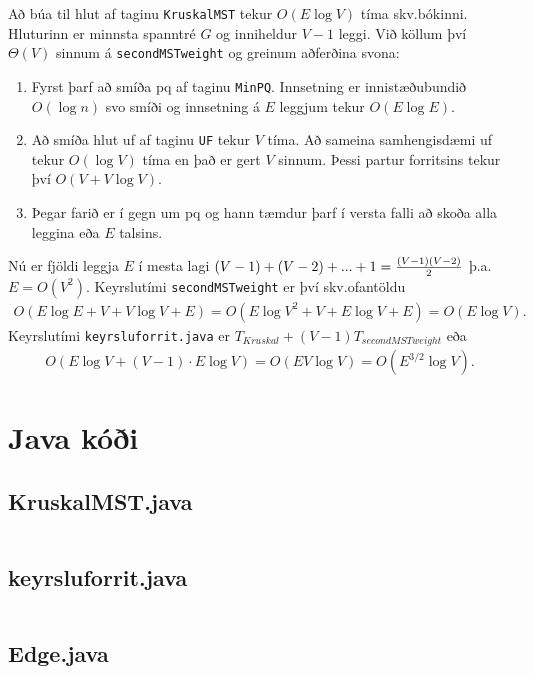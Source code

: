 \documentclass[a4paper,oneside]{article}
\begin{document}
\noindent
Að búa til hlut af taginu \texttt{KruskalMST} tekur $O(E \log V)$ tíma skv.\@ bókinni. Hluturinn er minnsta spanntré $G$ og inniheldur $V-1$ leggi. Við köllum því $\Theta(V)$ sinnum á \texttt{secondMSTweight} og greinum aðferðina svona:
\begin{enumerate}
    \item Fyrst þarf að smíða pq af taginu \texttt{MinPQ}. Innsetning er innistæðubundið $O(\log n)$ svo smíði og innsetning á $E$ leggjum tekur $O(E \log E)$.
    \item Að smíða hlut uf af taginu \texttt{UF} tekur $V$ tíma. Að sameina samhengisdæmi uf tekur $O(\log V)$ tíma en það er gert $V$ sinnum. Þessi partur forritsins tekur því $O(V +  V \log V)$.
    \item Þegar farið er í gegn um pq og hann tæmdur þarf í versta falli að skoða alla leggina eða $E$ talsins.
\end{enumerate}
Nú er fjöldi leggja $E$ í mesta lagi $(V-1) + (V-2) + ... + 1 = {(V-1)(V-2) \over 2}$ þ.a.\@ $E = O(V^2)$. Keyrslutími \texttt{secondMSTweight} er því skv.\@ ofantöldu
\begin{align*}
    O(E \log E + V + V \log V + E) = O(E \log V^2 + V + E \log V + E) = O(E \log V).
\end{align*}
Keyrslutími \texttt{keyrsluforrit.java} er $T_{Kruskal} + (V-1) T_{secondMSTweight}$ eða
\begin{align*}
    O(E \log V + (V-1) \cdot E \log V) = O(EV \log V) = O(E^{3/2} \log V).
\end{align*}


\pagebreak
\section{Java kóði}
\subsection{KruskalMST.java}
\inputminted[]{java}{../KruskalMST.java}

\subsection{keyrsluforrit.java}
\inputminted[]{java}{../keyrsluforrit.java}

\subsection{Edge.java}
\inputminted[firstline=91,firstnumber=91,lastline=131]{java}{../Edge.java}
\end{document}

